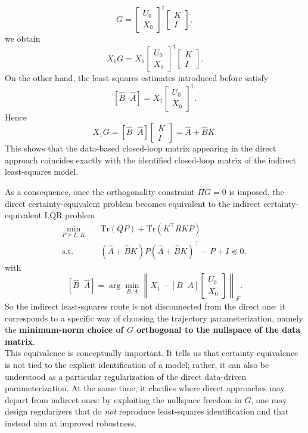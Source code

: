 \[
G =
\begin{bmatrix}
U_0\\[0.3em]
X_0
\end{bmatrix}^{\dagger}
\begin{bmatrix}
K\\[0.3em]
I
\end{bmatrix},
\]
we obtain
\[
X_1G
=
X_1
\begin{bmatrix}
U_0\\[0.3em]
X_0
\end{bmatrix}^{\dagger}
\begin{bmatrix}
K\\[0.3em]
I
\end{bmatrix}.
\]
On the other hand, the least-squares estimates introduced before satisfy
\[
[\hat B\;\;\hat A]
=
X_1
\begin{bmatrix}
U_0\\[0.3em]
X_0
\end{bmatrix}^{\dagger}.
\]
Hence
\[
X_1G
=
[\hat B\;\;\hat A]
\begin{bmatrix}
K\\[0.3em]
I
\end{bmatrix}
=
\hat A+\hat B K.
\]
This shows that the data-based closed-loop matrix appearing in the direct approach coincides
exactly with the identified closed-loop matrix of the indirect least-squares model.

As a consequence, once the orthogonality constraint $\Pi G=0$ is imposed, the direct
certainty-equivalent problem becomes equivalent to the indirect certainty-equivalent LQR problem
\[
\begin{aligned}
\min_{P \succeq I,\;K}\quad
& \text{Tr}(QP)+\text{Tr}(K^\top RKP)\\
\text{s.t.}\quad
& (\hat A+\hat B K)P(\hat A+\hat B K)^\top - P + I \preceq 0,
\end{aligned}
\]
with
\[
[\hat B\;\;\hat A]
=
\arg\min_{B,A}
\left\|
X_1 - [B\;\;A]
\begin{bmatrix}
U_0\\[0.3em]
X_0
\end{bmatrix}
\right\|_F.
\]
So the indirect least-squares route is not disconnected from the direct one: it corresponds to a
specific way of choosing the trajectory parameterization, namely the \textbf{minimum-norm choice of
$G$ orthogonal to the nullspace of the data matrix}.\\
This equivalence is conceptually important. It tells us that certainty-equivalence is not tied to
the explicit identification of a model; rather, it can also be understood as a particular
regularization of the direct data-driven parameterization. At the same time, it clarifies where
direct approaches may depart from indirect ones: by exploiting the nullspace freedom in $G$,
one may design regularizers that do \emph{not} reproduce least-squares identification and that
instead aim at improved robustness.


